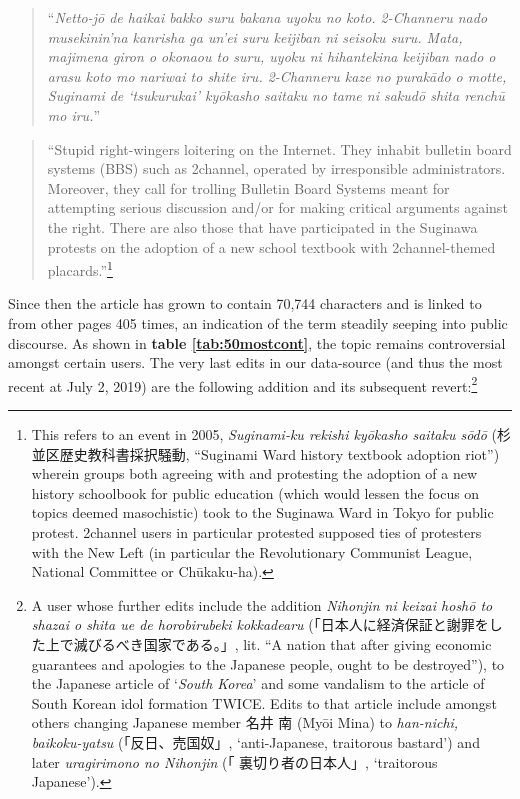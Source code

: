 \documentclass[10pt,british,A4paper,oneside]{memoir}
\begin{document}
\begin{quote}
``\emph{Netto-jō de haikai bakko suru bakana uyoku no koto. 2-Channeru
nado musekinin'na kanrisha ga un'ei suru keijiban ni seisoku suru. Mata,
majimena giron o okonaou to suru, uyoku ni hihantekina keijiban nado o
arasu koto mo nariwai to shite iru. 2-Channeru kaze no purakādo o
motte, Suginami de `tsukurukai' kyōkasho saitaku no tame ni sakudō shita
renchū mo iru.}''
\end{quote}

\begin{quote}
``Stupid right-wingers loitering on the Internet. They inhabit bulletin
board systems (BBS) such as 2channel, operated by irresponsible
administrators. Moreover, they call for trolling Bulletin Board Systems
meant for attempting serious discussion and/or for making critical
arguments against the right. There are also those that have participated
in the Suginawa protests on the adoption of a new school textbook with
2channel-themed placards.''\footnote{This refers to an event in 2005,
  \emph{Suginami-ku rekishi kyōkasho saitaku sōdō}
  (杉並区歴史教科書採択騒動, ``Suginami Ward history textbook adoption
  riot'') wherein groups both agreeing with and protesting the adoption
  of a new history schoolbook for public education (which would lessen
  the focus on topics deemed masochistic) took to the Suginawa Ward in
  Tokyo for public protest. 2channel users in particular protested
  supposed ties of protesters with the New Left (in particular the
  Revolutionary Communist League, National Committee or Chūkaku-ha).}
\end{quote}

Since then the article has grown to contain 70,744 characters and is
linked to from other pages 405 times, an indication of the term steadily
seeping into public discourse. As shown in \textbf{table
\ref{tab:50mostcont}}, the topic remains controversial amongst certain
users. The very last edits in our data-source (and thus the most recent
at July 2, 2019) are the following addition and its subsequent
revert:\footnote{A user whose further edits include the addition
  \emph{Nihonjin ni keizai hoshō to shazai o shita ue de horobirubeki
  kokkadearu}
  (「日本人に経済保証と謝罪をした上で滅びるべき国家である。」, lit. ``A
  nation that after giving economic guarantees and apologies to the
  Japanese people, ought to be destroyed''), to the Japanese article of
  `\emph{South Korea}' and some vandalism to the article of South Korean
  idol formation TWICE. Edits to that article include amongst others
  changing Japanese member 名井 南 (Myōi Mina) to \emph{han-nichi,
  baikoku-yatsu} (「反日、売国奴」, `anti-Japanese, traitorous bastard')
  and later \emph{uragirimono no Nihonjin} (「 裏切り者の日本人」,
  `traitorous Japanese').}
\end{document}
